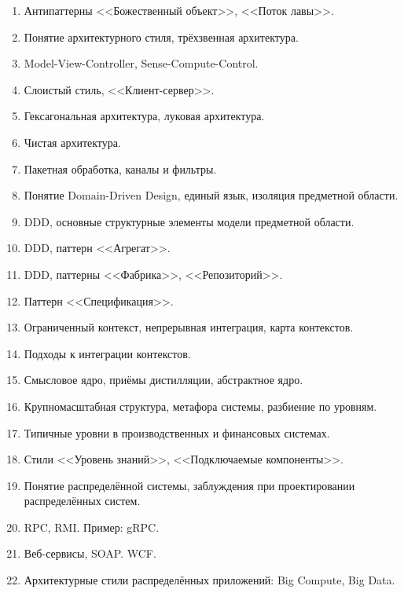 \documentclass[a5paper]{article}
\begin{document}
\begin{enumerate}
    \item Антипаттерны <<Божественный объект>>, <<Поток лавы>>.
    \item Понятие архитектурного стиля, трёхзвенная архитектура.
    \item Model-View-Controller, Sense-Compute-Control.
    \item Слоистый стиль, <<Клиент-сервер>>.
    \item Гексагональная архитектура, луковая архитектура.
    \item Чистая архитектура.
    \item Пакетная обработка, каналы и фильтры. %
    \item Понятие Domain-Driven Design, единый язык, изоляция предметной области.
    \item DDD, основные структурные элементы модели предметной области.
    \item DDD, паттерн <<Агрегат>>.
    \item DDD, паттерны <<Фабрика>>, <<Репозиторий>>.
    \item Паттерн <<Спецификация>>.
	\item Ограниченный контекст, непрерывная интеграция, карта контекстов.
    \item Подходы к интеграции контекстов.
    \item Смысловое ядро, приёмы дистилляции, абстрактное ядро.
    \item Крупномасштабная структура, метафора системы, разбиение по уровням. 
    \item Типичные уровни в производственных и финансовых системах.
    \item Стили <<Уровень знаний>>, <<Подключаемые компоненты>>.
    \item Понятие распределённой системы, заблуждения при проектировании распределённых систем.
    \item RPC, RMI. Пример: gRPC.
    \item Веб-сервисы, SOAP. WCF.
    \item Архитектурные стили распределённых приложений: Big Compute, Big Data.

\end{enumerate}
\end{document}
